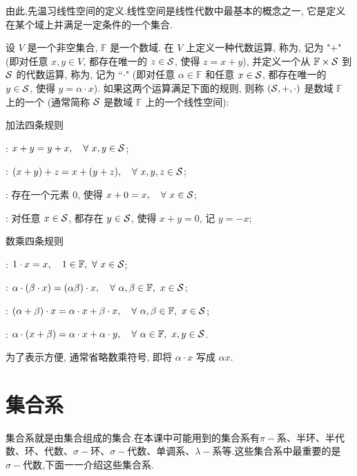 由此,先温习线性空间的定义.线性空间是线性代数中最基本的概念之一, 它是定义在某个域上并满足一定条件的一个集合.
\begin{definition}[线性空间]
	设 $V$ 是一个非空集合, $\mathbb{F}$ 是一个数域.
	在 $V$ 上定义一种代数运算, 称为, 记为 "$+$"
	(即对任意 $x, y\in V$, 都存在唯一的 $z\in\mathcal{S}$, 使得 $z=x+y$),
	并定义一个从 $\mathbb{F}\times\mathcal{S}$ 到 $\mathcal{S}$ 的代数运算, 称为,
	记为 ``$\cdot$" (即对任意 $\alpha\in\mathbb{F}$ 和任意 $x\in\mathcal{S}$,
	都存在唯一的 $y\in\mathcal{S}$, 使得 $y=\alpha\cdot x$).
	如果这两个运算满足下面的规则,
	则称 $(\mathcal{S},+,\cdot)$ 是数域 $\mathbb{F}$ 上的一个
	(通常简称 $\mathcal{S}$ 是数域 $\mathbb{F}$ 上的一个线性空间):
	\begin{blist}
		\item 加法四条规则
		\begin{nlist}
			\item {}: $x + y = y + x, \quad
			\forall\ x,y\in\mathcal{S}$;
			\item {}: $(x + y) + z = x + (y + z),
			\quad \forall\ x, y, z\in\mathcal{S}$;
			\item {}: 存在一个元素 0, 使得
			$x + 0 = x,\quad \forall\ x\in\mathcal{S}$;
			\item {}: 对任意 $x\in\mathcal{S}$, 都存在
			$y\in\mathcal{S}$, 使得 $x + y=0$, 记 $y=-x$;
		\end{nlist}
		\item 数乘四条规则
		\begin{nlist}
			\item \myem{单位元}:
			$1\cdot x=x,\quad 1\in\mathbb{F},\ \forall\ x\in\SS$;
			\item {}: $\alpha\cdot(\beta\cdot x)=(\alpha \beta)\cdot x,\quad
			\forall\ \alpha,\beta\in\mathbb{F},\ x\in\mathcal{S}$;
			\item {}:  $(\alpha+\beta)\cdot x=\alpha\cdot x+\beta\cdot x,\quad
			\forall\ \alpha,\beta\in\mathbb{F},\ x\in\mathcal{S}$;
			\item {}:  $\alpha\cdot(x+\beta)=\alpha\cdot x+\alpha\cdot y,\quad
			\forall\ \alpha\in\mathbb{F},\ x, y\in\mathcal{S}$.
		\end{nlist}
	\end{blist}
	为了表示方便, 通常省略数乘符号, 即将 $\alpha\cdot x$ 写成 $\alpha x$.
\end{definition}

\section{集合系}
集合系就是由集合组成的集合.在本课中可能用到的集合系有$\pi-\text{系}$、半环、半代数、环、代数、$\sigma-\text{环}$、$\sigma-\text{代数}$、单调系、$\lambda-\text{系}$等.这些集合系中最重要的是$\sigma-\text{代数}$,下面一一介绍这些集合系.

